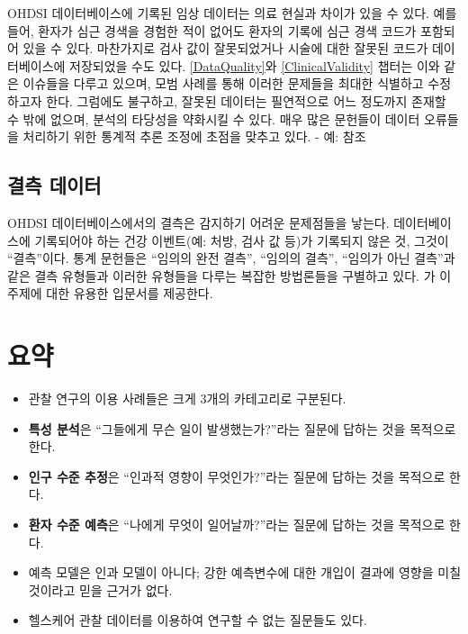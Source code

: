 \documentclass[11pt]{book}
\theoremstyle{definition}
\theoremstyle{definition}
\theoremstyle{definition}
\theoremstyle{remark}
\let\BeginKnitrBlock\begin \let\EndKnitrBlock\end
\begin{document}
OHDSI 데이터베이스에 기록된 임상 데이터는 의료 현실과 차이가 있을 수
있다. 예를 들어, 환자가 심근 경색을 경험한 적이 없어도 환자의 기록에
심근 경색 코드가 포함되어 있을 수 있다. 마찬가지로 검사 값이
잘못되었거나 시술에 대한 잘못된 코드가 데이터베이스에 저장되었을 수도
있다. \ref{DataQuality}와 \ref{ClinicalValidity} 챕터는 이와 같은
이슈들을 다루고 있으며, 모범 사례를 통해 이러한 문제들을 최대한 식별하고
수정하고자 한다. 그럼에도 불구하고, 잘못된 데이터는 필연적으로 어느
정도까지 존재할 수 밖에 없으며, 분석의 타당성을 약화시킬 수 있다. 매우
많은 문헌들이 데이터 오류들을 처리하기 위한 통계적 추론 조정에 초점을
맞추고 있다. - 예: \citet{fuller2009measurement} 참조

\subsection{결측 데이터}\label{-}


OHDSI 데이터베이스에서의 결측은 감지하기 어려운 문제점들을 낳는다.
데이터베이스에 기록되어야 하는 건강 이벤트(예: 처방, 검사 값 등)가
기록되지 않은 것, 그것이 ``결측''이다. 통계 문헌들은 ``임의의 완전
결측'', ``임의의 결측'', ``임의가 아닌 결측''과 같은 결측 유형들과
이러한 유형들을 다루는 복잡한 방법론들을 구별하고 있다.
\citet{perkins2017principled} 가 이 주제에 대한 유용한 입문서를
제공한다.

\section{요약}\label{-1}

\BeginKnitrBlock{rmdsummary}
\begin{itemize}
\item
  관찰 연구의 이용 사례들은 크게 3개의 카테고리로 구분된다.
\item
  \textbf{특성 분석}은 ``그들에게 무슨 일이 발생했는가?''라는 질문에
  답하는 것을 목적으로 한다.
\item
  \textbf{인구 수준 추정}은 ``인과적 영향이 무엇인가?''라는 질문에
  답하는 것을 목적으로 한다.
\item
  \textbf{환자 수준 예측}은 ``나에게 무엇이 일어날까?''라는 질문에
  답하는 것을 목적으로 한다.
\item
  예측 모델은 인과 모델이 아니다; 강한 예측변수에 대한 개입이 결과에
  영향을 미칠 것이라고 믿을 근거가 없다.
\item
  헬스케어 관찰 데이터를 이용하여 연구할 수 없는 질문들도 있다.
\end{itemize}
\EndKnitrBlock{rmdsummary}
\end{document}
